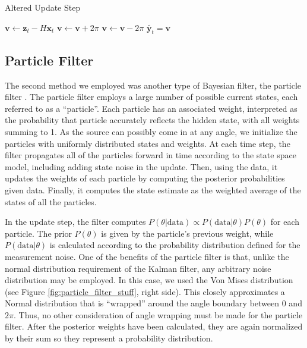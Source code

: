 \documentclass[11pt]{amsart}
\begin{document}
\begin{algorithm}
    \caption{Altered Update Step}\label{alg:kalman}    
    \begin{algorithmic}
        \State $\mathbf{v} \gets \mathbf{z}_t - H\mathbf{x}_t$
            \State $\mathbf{v} \gets \mathbf{v} + 2\pi$
            \State $\mathbf{v} \gets \mathbf{v} - 2\pi$
        \EndIf 
        \State $\tilde{\mathbf{y}_t} = \mathbf{v}$ 
        \end{algorithmic}
    \end{algorithm}


\subsection{Particle Filter}
The second method we employed was another type of Bayesian filter, the particle filter \cite{Particle}. The particle filter employs a large number of possible current states, each referred to 
as a “particle”. Each particle has an associated weight, interpreted as the probability that particle accurately reflects the hidden state, with all weights summing to 1. As the source can possibly 
come in at any angle, we initialize the particles with uniformly distributed states and weights. At each time step, the filter propagates all of the particles forward in time according to the state space 
model, including adding state noise in the update. Then, using the data, it updates the weights of each particle by computing the posterior probabilities given data. Finally, it computes the state estimate 
as the weighted average of the states of all the particles. 

In the update step, the filter computes $P(\theta|\text{data}) \propto P(\text{data}|\theta)P(\theta)$ for each particle. The prior $P(\theta)$ is given by the particle’s previous weight, while $P(\text{data}|\theta)$ is calculated 
according to the probability distribution defined for the measurement noise. One of the benefits of the particle filter is that, unlike the normal distribution requirement of the Kalman filter, any arbitrary noise 
distribution may be employed. In this case, we used the Von Mises distribution (see Figure \ref{fig:particle_filter_stuff}, right side). This closely approximates a Normal distribution 
that is “wrapped” around the angle boundary between $0$ and $2\pi$. Thus, no other consideration of angle wrapping must be made for the particle filter. After the posterior weights have been calculated, they are again normalized by 
their sum so they represent a probability distribution.
\end{document}
